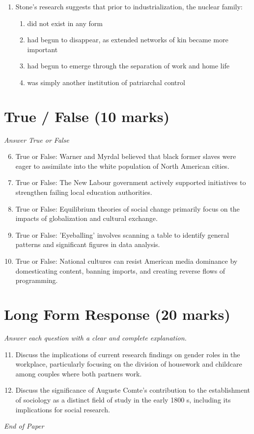\documentclass[12pt]{article}
\begin{document}
\begin{enumerate}[label=\arabic*.]
\begin{enumerate}[label=(\alph*)]
    \item issue-based concerns about culture and lifestyle
    \item false consciousness and the acceptance of hegemonic values
\end{enumerate}
\item Stone's research suggests that prior to industrialization, the nuclear family:
\begin{enumerate}[label=(\alph*)]
    \item did not exist in any form
    \item had begun to disappear, as extended networks of kin became more important
    \item had begun to emerge through the separation of work and home life
    \item was simply another institution of patriarchal control
\end{enumerate}
\end{enumerate}

\section*{True / False (10 marks)}
\textit{Answer True or False}
\begin{enumerate}[label=\arabic*.]
\setcounter{enumi}{5}
\item True or False: Warner and Myrdal believed that black former slaves were eager to assimilate into the white population of North American cities.
\item True or False: The New Labour government actively supported initiatives to strengthen failing local education authorities.
\item True or False: Equilibrium theories of social change primarily focus on the impacts of globalization and cultural exchange.
\item True or False: 'Eyeballing' involves scanning a table to identify general patterns and significant figures in data analysis.
\item True or False: National cultures can resist American media dominance by domesticating content, banning imports, and creating reverse flows of programming.
\end{enumerate}

\section*{Long Form Response (20 marks)}
\textit{Answer each question with a clear and complete explanation.}
\begin{enumerate}[label=\arabic*.]
\setcounter{enumi}{10}
\item Discuss the implications of current research findings on gender roles in the workplace, particularly focusing on the division of housework and childcare among couples where both partners work.
\item Discuss the significance of Auguste Comte's contribution to the establishment of sociology as a distinct field of study in the early 1800 s, including its implications for social research.
\end{enumerate}

\vfill
\noindent\textit{End of Paper}
\end{document}
